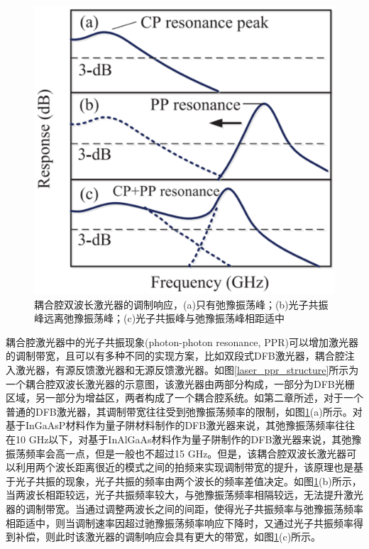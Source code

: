 \begin{figure}[htb]
	\centering
	\includegraphics[width=12cm]{./Pictures/laser_ppr.jpg}
	\captionsetup{justification=centering}
	\caption{耦合腔双波长激光器的调制响应，(a)只有弛豫振荡峰；(b)光子共振峰远离弛豫振荡峰；(c)光子共振峰与弛豫振荡峰相距适中\cite{wei2016realizing}}
	\label{laser_ppr}
\end{figure}

耦合腔激光器中的光子共振现象(photon-photon resonance, PPR)可以增加激光器的调制带宽，且可以有多种不同的实现方案，比如双段式DFB激光器\cite{wenzel1996mechanisms}，耦合腔注入激光器\cite{reithmaier2005modulation}，有源反馈激光器\cite{brox2003high}和无源反馈激光器\cite{tager1994high}。如图\ref{laser_ppr_structure}所示为一个耦合腔双波长激光器的示意图，该激光器由两部分构成，一部分为DFB光栅区域，另一部分为增益区，两者构成了一个耦合腔系统。如第二章所述，对于一个普通的DFB激光器，其调制带宽往往受到弛豫振荡频率的限制，如图\ref{laser_ppr}(a)所示。对基于InGaAsP材料作为量子阱材料制作的DFB激光器来说，其弛豫振荡频率往往在10 GHz以下，对基于InAlGaAs材料作为量子阱制作的DFB激光器来说，其弛豫振荡频率会高一点，但是一般也不超过15 GHz。但是，该耦合腔双波长激光器可以利用两个波长距离很近的模式之间的拍频来实现调制带宽的提升，该原理也是基于光子共振的现象，光子共振的频率由两个波长的频率差值决定。如图\ref{laser_ppr}(b)所示，当两波长相距较远，光子共振频率较大，与弛豫振荡频率相隔较远，无法提升激光器的调制带宽。当通过调整两波长之间的间距，使得光子共振频率与弛豫振荡频率相距适中，则当调制速率因超过驰豫振荡频率响应下降时，又通过光子共振频率得到补偿，则此时该激光器的调制响应会具有更大的带宽，如图\ref{laser_ppr}(c)所示。


